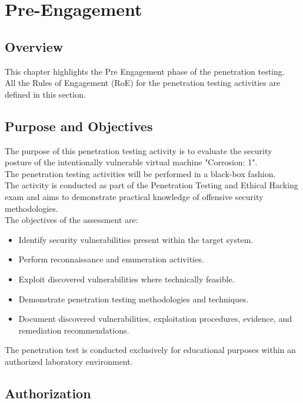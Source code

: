 \chapter{Pre-Engagement}

\section{Overview}
This chapter highlights the Pre Engagement phase of the penetration testing.
\\

All the Rules of Engagement (RoE) for the penetration testing activities are defined in this section.

\section{Purpose and Objectives}

The purpose of this penetration testing activity is to evaluate the security
posture of the intentionally vulnerable virtual machine "Corrosion: 1".
\\

The penetration testing activities will be performed in a black-box fashion.
\\

The activity is conducted as part of the Penetration Testing and Ethical
Hacking exam and aims to demonstrate practical knowledge of offensive
security methodologies.
\\

The objectives of the assessment are:

\begin{itemize}
    \item Identify security vulnerabilities present within the target system.
    \item Perform reconnaissance and enumeration activities.
    \item Exploit discovered vulnerabilities where technically feasible.
    \item Demonstrate penetration testing methodologies and techniques.
    \item Document discovered vulnerabilities, exploitation procedures,
    evidence, and remediation recommendations.
\end{itemize}

The penetration test is conducted exclusively for educational purposes within
an authorized laboratory environment.


\section{Authorization}

